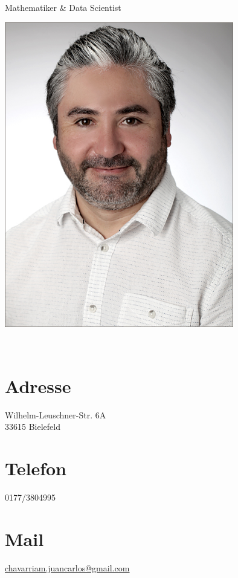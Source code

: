 \documentclass[a4paper]{cv-class}
\let\oldincludegraphics\includegraphics
\renewcommand\includegraphics[2][]{%
  \oldincludegraphics[#1,max width=10cm,max height=\textheight]{#2}
}
\begin{document}
      {Mathematiker \& Data Scientist}

\vspace{1.0cm}

\begin{aside}
  \includegraphics[scale=0.8]{foto_chavarria.jpg}
  	~
  \section{Adresse}
    Wilhelm-Leuschner-Str. 6A \\
    33615 Bielefeld
    ~
  \section{Telefon}
    0177/3804995
    ~
  \section{Mail}
  \underline{\href{mailto:chavarriam.juancarlos@gmail.com}{\footnotesize{chavarriam.juancarlos@gmail.com}}}
   ~

\end{aside}
\end{document}
